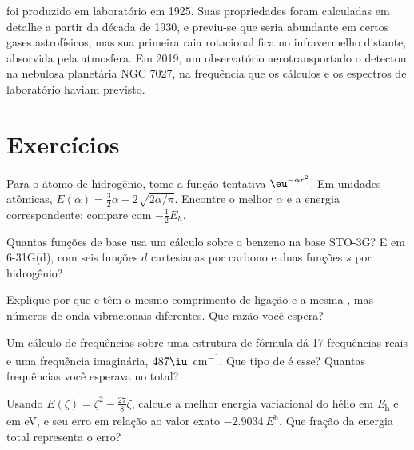 \begin{history}
 foi produzido em laboratório em 1925. Suas propriedades foram
calculadas em detalhe a partir da década de 1930, e previu-se que seria
abundante em certos gases astrofísicos; mas sua primeira raia rotacional fica
no infravermelho distante, absorvida pela atmosfera. Em 2019, um
observatório aerotransportado o detectou na nebulosa planetária NGC 7027, na
frequência que os cálculos e os espectros de laboratório haviam previsto.
\end{history}

\section{Exercícios}

\begin{exercise}[$\star$]\label{exo:b3:computational-chemistry:1}
Para o átomo de hidrogênio, tome a função tentativa $\eu^{-\alpha r^2}$. Em
unidades atômicas, $E(\alpha) = \frac32\alpha - 2\sqrt{2\alpha/\pi}$. Encontre o melhor
$\alpha$ e a energia correspondente; compare com $-\frac12E_h$.
\end{exercise}

\begin{exercise}[$\star$]\label{exo:b3:computational-chemistry:2}
Quantas funções de base usa um cálculo sobre o benzeno na base STO-3G?
E em 6-31G(d), com seis funções $d$ cartesianas por carbono e duas funções $s$
por hidrogênio?
\end{exercise}

\begin{exercise}[$\star$]\label{exo:b3:computational-chemistry:3}
Explique por que  e  têm o mesmo comprimento de ligação e a
mesma , mas números de onda vibracionais diferentes. Que
razão você espera?
\end{exercise}

\begin{exercise}[$\star$]\label{exo:b3:computational-chemistry:4}
Um cálculo de frequências sobre uma estrutura de fórmula  dá 17
frequências reais e uma frequência imaginária, $487\iu$~\unit{cm^{-1}}. Que tipo
de  é esse? Quantas frequências você esperava no total?
\end{exercise}

\begin{exercise}[$\star\star$]\label{exo:b3:computational-chemistry:5}
Usando $E(\zeta) = \zeta^2 - \frac{27}{8}\zeta$, calcule a melhor energia
variacional do hélio em \unit{\hartree} e em eV, e seu erro em relação ao valor exato
$\qty{-2.9034}{\hartree}$. Que fração da energia total representa o erro?
\end{exercise}

